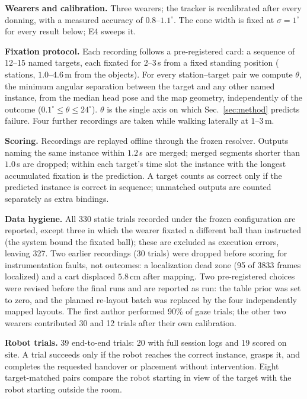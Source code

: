 \textbf{Wearers and calibration.} Three wearers; the tracker is
recalibrated after every donning, with a measured accuracy of
$0.8$--$1.1^\circ$. The cone width is fixed at $\sigma=1^\circ$ for
every result below; E4 sweeps it.

\textbf{Fixation protocol.} Each recording follows a pre-registered
card: a sequence of 12--15 named targets, each fixated for 2--3\,s
from a fixed standing position ( stations,
$1.0$--$4.6$\,m from the objects). For every station--target pair we
compute $\theta$, the minimum angular separation between the target
and any other named instance, from the median head pose and the map
geometry, independently of the outcome
($0.1^\circ\le\theta\le24^\circ$). $\theta$ is the single axis on
which Sec.~\ref{sec:method} predicts failure. Four further recordings
are taken while walking laterally at $1$--$3$\,m.

\textbf{Scoring.} Recordings are replayed offline through the frozen
resolver. Outputs naming the same instance within $1.2$\,s are
merged; merged segments shorter than $1.0$\,s are dropped; within each
target's time slot the instance with the longest accumulated
fixation is the prediction. A target counts as correct only if the
predicted instance is correct in sequence; unmatched outputs are
counted separately as extra bindings.

\textbf{Data hygiene.} All 330 static trials recorded under the
frozen configuration are reported, except three in which the wearer
fixated a different ball than instructed (the system bound the
fixated ball); these are excluded as execution errors, leaving 327.
Two earlier recordings (30 trials) were dropped before scoring for
instrumentation faults, not outcomes: a localization dead zone (95 of
3833 frames localized) and a cart displaced $5.8$\,cm after mapping.
Two pre-registered choices were revised before the final runs and are
reported as run: the table prior was set to zero, and the planned
re-layout batch was replaced by the four independently mapped
layouts. The first author performed 90\% of gaze trials; the other
two wearers contributed 30 and 12 trials after their own calibration.

\textbf{Robot trials.} 39 end-to-end trials: 20 with full session
logs and 19 scored on site. A trial succeeds only if the robot
reaches the correct instance, grasps it, and completes the requested
handover or placement without intervention. Eight target-matched
pairs compare the robot starting in view of the target with the robot
starting outside the room.

